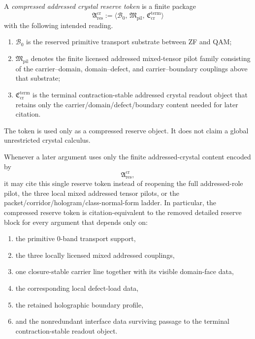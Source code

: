 \begin{definition}
\label{def:compressed-addressed-crystal-reserve-token}
A \emph{compressed addressed crystal reserve token} is a finite package
\[
  \mathfrak A^{\mathrm{cr}}_{\mathrm{res}}
  :=
  \langle \mathcal B_0,\, \mathfrak M_{\mathrm{pil}},\, \mathfrak C^{\mathrm{term}}_{\mathrm{cr}} \rangle
\]
with the following intended reading.
\begin{enumerate}[leftmargin=2em,label=(\roman*)]
  \item $\mathcal B_0$ is the reserved primitive transport substrate between ZF and QAM;
  \item $\mathfrak M_{\mathrm{pil}}$ denotes the finite licensed addressed mixed-tensor pilot family consisting of the carrier--domain, domain--defect, and carrier--boundary couplings above that substrate;
  \item $\mathfrak C^{\mathrm{term}}_{\mathrm{cr}}$ is the terminal contraction-stable addressed crystal readout object that retains only the carrier/domain/defect/boundary content needed for later citation.
\end{enumerate}
The token is used only as a compressed reserve object. It does not claim a global unrestricted crystal calculus.
\end{definition}

\begin{proposition}
\label{prop:compressed-addressed-crystal-reserve-package}
Whenever a later argument uses only the finite addressed-crystal content encoded by
\[
  \mathfrak A^{\mathrm{cr}}_{\mathrm{res}},
\]
it may cite this single reserve token instead of reopening the full addressed-role pilot, the three local mixed addressed tensor pilots, or the packet/corridor/hologram/class-normal-form ladder. In particular, the compressed reserve token is citation-equivalent to the removed detailed reserve block for every argument that depends only on:
\begin{enumerate}[leftmargin=2em,label=(\roman*)]
  \item the primitive 0-band transport support,
  \item the three locally licensed mixed addressed couplings,
  \item one closure-stable carrier line together with its visible domain-face data,
  \item the corresponding local defect-load data,
  \item the retained holographic boundary profile,
  \item and the nonredundant interface data surviving passage to the terminal contraction-stable readout object.
\end{enumerate}
\end{proposition}

